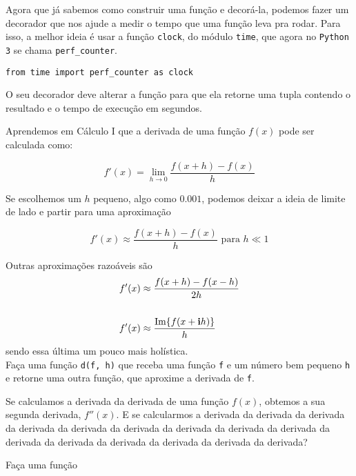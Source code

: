 \documentclass[12pt]{article}
\begin{document}
	
	Agora que já sabemos como construir uma função e decorá-la, podemos fazer um decorador que nos ajude a medir o tempo que uma função leva pra rodar. Para isso, a melhor ideia é usar a função \texttt{clock}, do módulo \texttt{time}, que agora no \texttt{Python 3} se chama \texttt{perf\_{}counter}.
	
	\begin{lstlisting}
from time import perf_counter as clock
	\end{lstlisting}
	
	\quest O seu decorador deve alterar a função para que ela retorne uma tupla contendo o resultado e o tempo de execução em segundos.
	
	
	Aprendemos em Cálculo I que a derivada de uma função $f(x)$ pode ser calculada como:
	
		$$f'(x) = \lim_{h \to 0} \frac{f(x + h) - f(x)}{h}$$
	
	Se escolhemos um $h$ pequeno, algo como $0.001$, podemos deixar a ideia de limite de lado e partir para uma aproximação
	
		$$f'(x) \approx \frac{f(x + h) - f(x)}{h} \text{ para } h \ll 1$$

	Outras aproximações razoáveis são	
		\begin{align*}
		f'(x) &\approx \frac{f(x + h) - f(x - h)}{2h}\\
		\\		
		f'(x) &\approx \frac{ \text{Im}\{f(x + \mathbf{i}h)\} }{h} 
		\end{align*}	
	sendo essa última um pouco mais holística.\\
	
	\quest Faça uma função \texttt{d(f, h)} que receba uma função \texttt{f} e um número bem pequeno \texttt{h} e retorne uma outra função, que aproxime a derivada de \texttt{f}.
	
	
	Se calculamos a derivada da derivada de uma função $f(x)$, obtemos a sua segunda derivada, $f''(x)$. E se calcularmos a derivada da derivada da derivada da derivada da derivada da derivada da derivada da derivada da derivada da derivada da derivada da derivada da derivada da derivada da derivada?
	
	\quest Faça uma função
	
	
	
\end{document}
